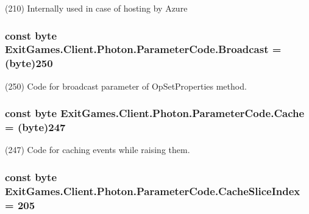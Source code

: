 (210) Internally used in case of hosting by Azure

\subsubsection[{\texorpdfstring{Broadcast}{Broadcast}}]{\setlength{\rightskip}{0pt plus 5cm}const byte Exit\+Games.\+Client.\+Photon.\+Parameter\+Code.\+Broadcast = (byte)250}\hypertarget{class_exit_games_1_1_client_1_1_photon_1_1_parameter_code_aed4f6c5478998620b924bc944fd61799}{}\label{class_exit_games_1_1_client_1_1_photon_1_1_parameter_code_aed4f6c5478998620b924bc944fd61799}


(250) Code for broadcast parameter of Op\+Set\+Properties method.

\subsubsection[{\texorpdfstring{Cache}{Cache}}]{\setlength{\rightskip}{0pt plus 5cm}const byte Exit\+Games.\+Client.\+Photon.\+Parameter\+Code.\+Cache = (byte)247}\hypertarget{class_exit_games_1_1_client_1_1_photon_1_1_parameter_code_a1b6065b6632880edd0321b1e3b8a2fb9}{}\label{class_exit_games_1_1_client_1_1_photon_1_1_parameter_code_a1b6065b6632880edd0321b1e3b8a2fb9}


(247) Code for caching events while raising them.

\subsubsection[{\texorpdfstring{Cache\+Slice\+Index}{CacheSliceIndex}}]{\setlength{\rightskip}{0pt plus 5cm}const byte Exit\+Games.\+Client.\+Photon.\+Parameter\+Code.\+Cache\+Slice\+Index = 205}\hypertarget{class_exit_games_1_1_client_1_1_photon_1_1_parameter_code_adb42ad64e327b8226f09f99b470a525d}{}\label{class_exit_games_1_1_client_1_1_photon_1_1_parameter_code_adb42ad64e327b8226f09f99b470a525d}


